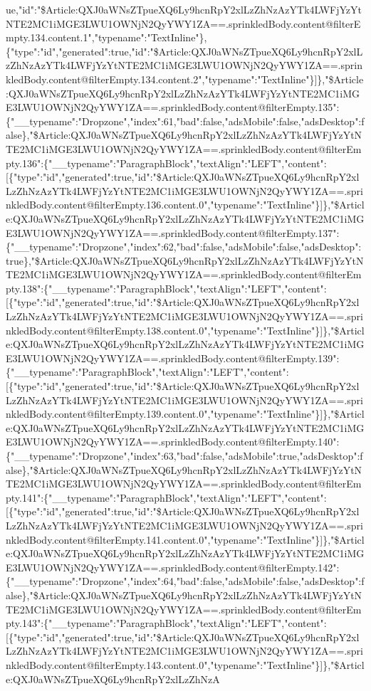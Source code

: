 ue,"id":"\$Article:QXJ0aWNsZTpueXQ6Ly9hcnRpY2xlLzZhNzAzYTk4LWFjYzYtNTE2MC1iMGE3LWU1OWNjN2QyYWY1ZA==.sprinkledBody.content@filterEmpty.134.content.1","typename":"TextInline"\},\{"type":"id","generated":true,"id":"\$Article:QXJ0aWNsZTpueXQ6Ly9hcnRpY2xlLzZhNzAzYTk4LWFjYzYtNTE2MC1iMGE3LWU1OWNjN2QyYWY1ZA==.sprinkledBody.content@filterEmpty.134.content.2","typename":"TextInline"\}{]}\},"\$Article:QXJ0aWNsZTpueXQ6Ly9hcnRpY2xlLzZhNzAzYTk4LWFjYzYtNTE2MC1iMGE3LWU1OWNjN2QyYWY1ZA==.sprinkledBody.content@filterEmpty.135":\{"\_\_typename":"Dropzone","index":61,"bad":false,"adsMobile":false,"adsDesktop":false\},"\$Article:QXJ0aWNsZTpueXQ6Ly9hcnRpY2xlLzZhNzAzYTk4LWFjYzYtNTE2MC1iMGE3LWU1OWNjN2QyYWY1ZA==.sprinkledBody.content@filterEmpty.136":\{"\_\_typename":"ParagraphBlock","textAlign":"LEFT","content":{[}\{"type":"id","generated":true,"id":"\$Article:QXJ0aWNsZTpueXQ6Ly9hcnRpY2xlLzZhNzAzYTk4LWFjYzYtNTE2MC1iMGE3LWU1OWNjN2QyYWY1ZA==.sprinkledBody.content@filterEmpty.136.content.0","typename":"TextInline"\}{]}\},"\$Article:QXJ0aWNsZTpueXQ6Ly9hcnRpY2xlLzZhNzAzYTk4LWFjYzYtNTE2MC1iMGE3LWU1OWNjN2QyYWY1ZA==.sprinkledBody.content@filterEmpty.137":\{"\_\_typename":"Dropzone","index":62,"bad":false,"adsMobile":false,"adsDesktop":true\},"\$Article:QXJ0aWNsZTpueXQ6Ly9hcnRpY2xlLzZhNzAzYTk4LWFjYzYtNTE2MC1iMGE3LWU1OWNjN2QyYWY1ZA==.sprinkledBody.content@filterEmpty.138":\{"\_\_typename":"ParagraphBlock","textAlign":"LEFT","content":{[}\{"type":"id","generated":true,"id":"\$Article:QXJ0aWNsZTpueXQ6Ly9hcnRpY2xlLzZhNzAzYTk4LWFjYzYtNTE2MC1iMGE3LWU1OWNjN2QyYWY1ZA==.sprinkledBody.content@filterEmpty.138.content.0","typename":"TextInline"\}{]}\},"\$Article:QXJ0aWNsZTpueXQ6Ly9hcnRpY2xlLzZhNzAzYTk4LWFjYzYtNTE2MC1iMGE3LWU1OWNjN2QyYWY1ZA==.sprinkledBody.content@filterEmpty.139":\{"\_\_typename":"ParagraphBlock","textAlign":"LEFT","content":{[}\{"type":"id","generated":true,"id":"\$Article:QXJ0aWNsZTpueXQ6Ly9hcnRpY2xlLzZhNzAzYTk4LWFjYzYtNTE2MC1iMGE3LWU1OWNjN2QyYWY1ZA==.sprinkledBody.content@filterEmpty.139.content.0","typename":"TextInline"\}{]}\},"\$Article:QXJ0aWNsZTpueXQ6Ly9hcnRpY2xlLzZhNzAzYTk4LWFjYzYtNTE2MC1iMGE3LWU1OWNjN2QyYWY1ZA==.sprinkledBody.content@filterEmpty.140":\{"\_\_typename":"Dropzone","index":63,"bad":false,"adsMobile":true,"adsDesktop":false\},"\$Article:QXJ0aWNsZTpueXQ6Ly9hcnRpY2xlLzZhNzAzYTk4LWFjYzYtNTE2MC1iMGE3LWU1OWNjN2QyYWY1ZA==.sprinkledBody.content@filterEmpty.141":\{"\_\_typename":"ParagraphBlock","textAlign":"LEFT","content":{[}\{"type":"id","generated":true,"id":"\$Article:QXJ0aWNsZTpueXQ6Ly9hcnRpY2xlLzZhNzAzYTk4LWFjYzYtNTE2MC1iMGE3LWU1OWNjN2QyYWY1ZA==.sprinkledBody.content@filterEmpty.141.content.0","typename":"TextInline"\}{]}\},"\$Article:QXJ0aWNsZTpueXQ6Ly9hcnRpY2xlLzZhNzAzYTk4LWFjYzYtNTE2MC1iMGE3LWU1OWNjN2QyYWY1ZA==.sprinkledBody.content@filterEmpty.142":\{"\_\_typename":"Dropzone","index":64,"bad":false,"adsMobile":false,"adsDesktop":false\},"\$Article:QXJ0aWNsZTpueXQ6Ly9hcnRpY2xlLzZhNzAzYTk4LWFjYzYtNTE2MC1iMGE3LWU1OWNjN2QyYWY1ZA==.sprinkledBody.content@filterEmpty.143":\{"\_\_typename":"ParagraphBlock","textAlign":"LEFT","content":{[}\{"type":"id","generated":true,"id":"\$Article:QXJ0aWNsZTpueXQ6Ly9hcnRpY2xlLzZhNzAzYTk4LWFjYzYtNTE2MC1iMGE3LWU1OWNjN2QyYWY1ZA==.sprinkledBody.content@filterEmpty.143.content.0","typename":"TextInline"\}{]}\},"\$Article:QXJ0aWNsZTpueXQ6Ly9hcnRpY2xlLzZhNzA